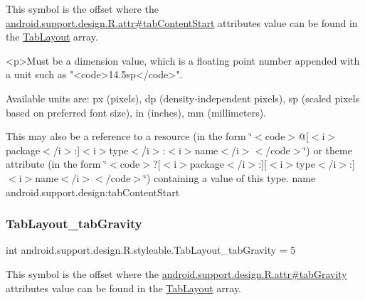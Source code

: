 This symbol is the offset where the \hyperlink{classandroid_1_1support_1_1design_1_1R_1_1attr_a6f43be6856c3cd04f1b3ea14fc2cc302}{android.\+support.\+design.\+R.\+attr\#tab\+Content\+Start} attribute\textquotesingle{}s value can be found in the \hyperlink{classandroid_1_1support_1_1design_1_1R_1_1styleable_a514b47b47f600f9421b65f4f0aa832d6}{Tab\+Layout} array.

\begin{DoxyVerb}      <p>Must be a dimension value, which is a floating point number appended with a unit such as "<code>14.5sp</code>".
\end{DoxyVerb}
 Available units are\+: px (pixels), dp (density-\/independent pixels), sp (scaled pixels based on preferred font size), in (inches), mm (millimeters). 

This may also be a reference to a resource (in the form \char`\"{}$<$code$>$@\mbox{[}$<$i$>$package$<$/i$>$\+:\mbox{]}$<$i$>$type$<$/i$>$\+:$<$i$>$name$<$/i$>$$<$/code$>$\char`\"{}) or theme attribute (in the form \char`\"{}$<$code$>$?\mbox{[}$<$i$>$package$<$/i$>$\+:\mbox{]}\mbox{[}$<$i$>$type$<$/i$>$\+:\mbox{]}$<$i$>$name$<$/i$>$$<$/code$>$\char`\"{}) containing a value of this type.  name android.\+support.\+design\+:tab\+Content\+Start \mbox{\label{classandroid_1_1support_1_1design_1_1R_1_1styleable_afba6408f9364ca3427b36d591ce6563f}} 
\subsubsection{\texorpdfstring{Tab\+Layout\+\_\+tab\+Gravity}{TabLayout\_tabGravity}}
{\footnotesize\ttfamily int android.\+support.\+design.\+R.\+styleable.\+Tab\+Layout\+\_\+tab\+Gravity = 5\hspace{0.3cm}{\ttfamily [static]}}

This symbol is the offset where the \hyperlink{classandroid_1_1support_1_1design_1_1R_1_1attr_aa49ae8d39f1825bc91c6650270a48781}{android.\+support.\+design.\+R.\+attr\#tab\+Gravity} attribute\textquotesingle{}s value can be found in the \hyperlink{classandroid_1_1support_1_1design_1_1R_1_1styleable_a514b47b47f600f9421b65f4f0aa832d6}{Tab\+Layout} array.


